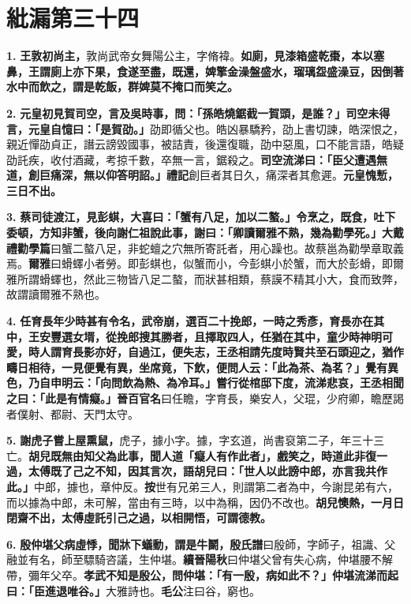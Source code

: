 \chapter{紕漏第三十四}

\textbf{1.} \textbf{王敦初尚主，}{\footnotesize 敦尚武帝女舞陽公主，字脩褘。}\textbf{如廁，見漆箱盛乾棗，本以塞鼻，王謂廁上亦下果，食遂至盡，既還，婢擎金澡盤盛水，瑠璃盌盛澡豆，因倒著水中而飲之，謂是乾飯，群婢莫不掩口而笑之。}

\textbf{2.} \textbf{元皇初見賀司空，言及吳時事，問：「孫皓燒鋸截一賀頭，是誰？」司空未得言，元皇自憶曰：「是賀劭。」}{\footnotesize 劭即循父也。皓凶暴驕矜，劭上書切諫，皓深恨之，親近憚劭貞正，譖云謗毀國事，被詰責，後還復職，劭中惡風，口不能言語，皓疑劭託疾，收付酒藏，考掠千數，卒無一言，鋸殺之。}\textbf{司空流涕曰：「臣父遭遇無道，創巨痛深，無以仰答明詔。」}{\footnotesize \textbf{禮記}創巨者其日久，痛深者其愈遲。}\textbf{元皇愧慙，三日不出。}

\textbf{3.} \textbf{蔡司徒渡江，見彭蜞，大喜曰：「蟹有八足，加以二螯。」令烹之，既食，吐下委頓，方知非蟹，後向謝仁祖說此事，謝曰：「卿讀爾雅不熟，幾為勸學死。」}{\footnotesize \textbf{大戴禮勸學篇}曰蟹二螯八足，非蛇蟺之穴無所寄託者，用心躁也。故蔡邕為勸學章取義焉。\textbf{爾雅}曰螖蠌小者勞。即彭蜞也，似蟹而小，今彭蜞小於蟹，而大於彭螖，即爾雅所謂螖蠌也，然此三物皆八足二螯，而狀甚相類，蔡謨不精其小大，食而致弊，故謂讀爾雅不熟也。}

\textbf{4.} \textbf{任育長年少時甚有令名，武帝崩，選百二十挽郎，一時之秀彥，育長亦在其中，王安豐選女壻，從挽郎搜其勝者，且擇取四人，任猶在其中，童少時神明可愛，時人謂育長影亦好，自過江，便失志，王丞相請先度時賢共至石頭迎之，猶作疇日相待，一見便覺有異，坐席竟，下飲，便問人云：「此為茶、為茗？」覺有異色，乃自申明云：「向問飲為熱、為冷耳。」嘗行從棺邸下度，流涕悲哀，王丞相聞之曰：「此是有情癡。」}{\footnotesize \textbf{晉百官名}曰任瞻，字育長，樂安人，父琨，少府卿，瞻歷謁者僕射、都尉、天門太守。}

\textbf{5.} \textbf{謝虎子嘗上屋熏鼠，}{\footnotesize 虎子，據小字。據，字玄道，尚書裒第二子，年三十三亡。}\textbf{胡兒既無由知父為此事，聞人道「癡人有作此者」，戲笑之，時道此非復一過，太傅既了己之不知，因其言次，語胡兒曰：「世人以此謗中郎，亦言我共作此。」}{\footnotesize 中郎，據也，章仲反。\textbf{按}世有兄弟三人，則謂第二者為中，今謝昆弟有六，而以據為中郎，未可解，當由有三時，以中為稱，因仍不改也。}\textbf{胡兒懊熱，一月日閉齋不出，太傅虛託引己之過，以相開悟，可謂德教。}

\textbf{6.} \textbf{殷仲堪父病虛悸，聞牀下蟻動，謂是牛鬬，}{\footnotesize \textbf{殷氏譜}曰殷師，字師子，祖識、父融並有名，師至驃騎咨議，生仲堪。\textbf{續晉陽秋}曰仲堪父曾有失心病，仲堪腰不解帶，彌年父卒。}\textbf{孝武不知是殷公，問仲堪：「有一殷，病如此不？」仲堪流涕而起曰：「臣進退唯谷。」}{\footnotesize 大雅詩也。\textbf{毛公}注曰谷，窮也。}

